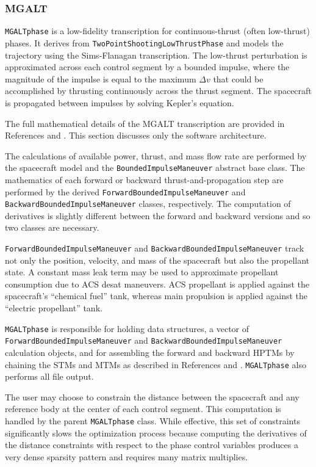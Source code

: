 \subsubsection{MGALT}
\label{subsubsec:MGALT}

\texttt{MGALTphase} is a low-fidelity transcription for continuous-thrust (often low-thrust) phases. It derives from \texttt{TwoPointShootingLowThrustPhase} and models the trajectory using the Sims-Flanagan transcription. The low-thrust perturbation is approximated across each control segment by a bounded impulse, where the magnitude of the impulse is equal to the maximum $\Delta v$ that could be accomplished by thrusting continuously across the thrust segment. The spacecraft is propagated between impulses by solving Kepler's equation.

The full mathematical details of the \ac{MGALT} transcription are provided in References \cite{BoundedImpulseDerivatives1} and \cite{BoundedImpulseDerivatives2}. This section discusses only the software architecture.

The calculations of available power, thrust, and mass flow rate are performed by the spacecraft model and the \texttt{BoundedImpulseManeuver} abstract base class. The mathematics of each forward or backward thrust-and-propagation step are performed by the derived \texttt{ForwardBoundedImpulseManeuver} and \texttt{BackwardBoundedImpulseManeuver} classes, respectively. The computation of derivatives is slightly different between the forward and backward versions and so two classes are necessary.

\texttt{ForwardBoundedImpulseManeuver} and \texttt{BackwardBoundedImpulseManeuver} track not only the position, velocity, and mass of the spacecraft but also the propellant state. A constant mass leak term may be used to approximate propellant consumption due to \ac{ACS} desat maneuvers. \ac{ACS} propellant is applied against the spacecraft's ``chemical fuel'' tank, whereas main propulsion is applied against the ``electric propellant'' tank.

\texttt{MGALTphase} is responsible for holding data structures, a vector of \texttt{ForwardBoundedImpulseManeuver} and \texttt{BackwardBoundedImpulseManeuver} calculation objects, and for assembling the forward and backward \ac{HPTM}s by chaining the \ac{STM}s and \ac{MTM}s as described in References \cite{BoundedImpulseDerivatives1} and \cite{BoundedImpulseDerivatives2}. \texttt{MGALTphase} also performs all file output.

The user may choose to constrain the distance between the spacecraft and any reference body at the center of each control segment. This computation is handled by the parent \texttt{MGALTphase} class. While effective, this set of constraints significantly slows the optimization process because computing the derivatives of the distance constraints with respect to the phase control variables produces a very dense sparsity pattern and requires many matrix multiplies.

